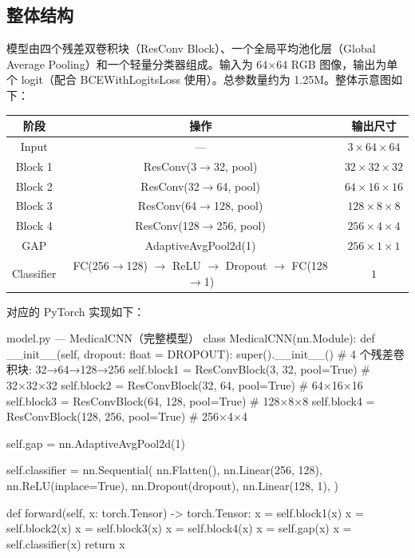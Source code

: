 \documentclass[12pt,a4paper]{ctexart}
\begin{document}
\subsection{整体结构}

模型由四个残差双卷积块（ResConv Block）、一个全局平均池化层（Global Average Pooling）和一个轻量分类器组成。输入为 64$\times$64 RGB 图像，输出为单个 logit（配合 BCEWithLogitsLoss 使用）。总参数量约为 1.25M。整体示意图如下：

\begin{center}
\begin{tabular}{c|c|c}
\toprule
阶段 & 操作 & 输出尺寸 \\
\midrule
Input  & —          & $3 \times 64 \times 64$ \\
Block 1 & ResConv(3$\rightarrow$32, pool)  & $32 \times 32 \times 32$ \\
Block 2 & ResConv(32$\rightarrow$64, pool)  & $64 \times 16 \times 16$ \\
Block 3 & ResConv(64$\rightarrow$128, pool) & $128 \times 8 \times 8$ \\
Block 4 & ResConv(128$\rightarrow$256, pool) & $256 \times 4 \times 4$ \\
GAP    & AdaptiveAvgPool2d(1)               & $256 \times 1 \times 1$ \\
Classifier & FC(256$\rightarrow$128) $\rightarrow$ ReLU $\rightarrow$ Dropout $\rightarrow$ FC(128$\rightarrow$1) & $1$ \\
\bottomrule
\end{tabular}
\end{center}

对应的 PyTorch 实现如下：

\begin{pythoncode}{model.py — MedicalCNN（完整模型）}
class MedicalCNN(nn.Module):
    def __init__(self, dropout: float = DROPOUT):
        super().__init__()
        # 4 个残差卷积块: 32→64→128→256
        self.block1 = ResConvBlock(3, 32, pool=True)     # 32×32×32
        self.block2 = ResConvBlock(32, 64, pool=True)    # 64×16×16
        self.block3 = ResConvBlock(64, 128, pool=True)   # 128×8×8
        self.block4 = ResConvBlock(128, 256, pool=True)  # 256×4×4

        self.gap = nn.AdaptiveAvgPool2d(1)

        self.classifier = nn.Sequential(
            nn.Flatten(),
            nn.Linear(256, 128),
            nn.ReLU(inplace=True),
            nn.Dropout(dropout),
            nn.Linear(128, 1),
        )

    def forward(self, x: torch.Tensor) -> torch.Tensor:
        x = self.block1(x)
        x = self.block2(x)
        x = self.block3(x)
        x = self.block4(x)
        x = self.gap(x)
        x = self.classifier(x)
        return x
\end{pythoncode}
\end{document}
